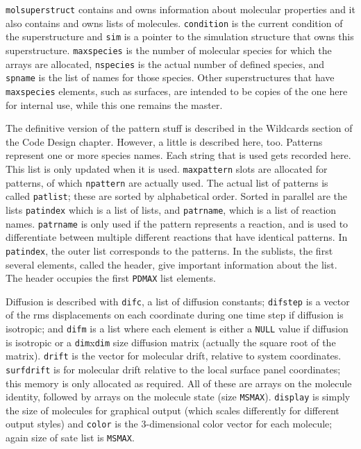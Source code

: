 \documentclass {book}
\begin{document}
\texttt{molsuperstruct} contains and owns information about molecular properties and it also contains and owns lists of molecules. \texttt{condition} is the current condition of the superstructure and \texttt{sim} is a pointer to the simulation structure that owns this superstructure. \texttt{maxspecies} is the number of molecular species for which the arrays are allocated, \texttt{nspecies} is the actual number of defined species, and \texttt{spname} is the list of names for those species. Other superstructures that have \texttt{maxspecies} elements, such as surfaces, are intended to be copies of the one here for internal use, while this one remains the master.

The definitive version of the pattern stuff is described in the Wildcards section of the Code Design chapter. However, a little is described here, too. Patterns represent one or more species names. Each string that is used gets recorded here. This list is only updated when it is used. \texttt{maxpattern} slots are allocated for patterns, of which \texttt{npattern} are actually used. The actual list of patterns is called \texttt{patlist}; these are sorted by alphabetical order. Sorted in parallel are the lists \texttt{patindex} which is a list of lists, and \texttt{patrname}, which is a list of reaction names. \texttt{patrname} is only used if the pattern represents a reaction, and is used to differentiate between multiple different reactions that have identical patterns. In \texttt{patindex}, the outer list corresponds to the patterns. In the sublists, the first several elements, called the header, give important information about the list. The header occupies the first \texttt{PDMAX} list elements.

Diffusion is described with \texttt{difc}, a list of diffusion constants; \texttt{difstep} is a vector of the rms displacements on each coordinate during one time step if diffusion is isotropic; and \texttt{difm} is a list where each element is either a \texttt{NULL} value if diffusion is isotropic or a \texttt{dim}x\texttt{dim} size diffusion matrix (actually the square root of the matrix). \texttt{drift} is the vector for molecular drift, relative to system coordinates. \texttt{surfdrift} is for molecular drift relative to the local surface panel coordinates; this memory is only allocated as required. All of these are arrays on the molecule identity, followed by arrays on the molecule state (size \texttt{MSMAX}). \texttt{display} is simply the size of molecules for graphical output (which scales differently for different output styles) and \texttt{color} is the 3-dimensional color vector for each molecule; again size of sate list is \texttt{MSMAX}.
\end{document}
